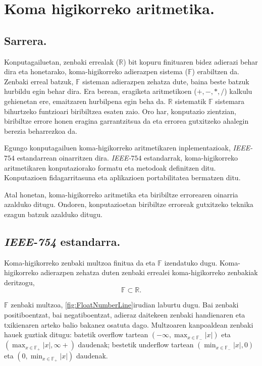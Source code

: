 \chapter{Koma higikorreko aritmetika.}
\label{sec:4}

\section{Sarrera.}

Konputagailuetan, zenbaki errealak ($\mathbb{R}$) bit kopuru finituaren bidez adierazi behar dira eta honetarako, koma-higikorreko adierazpen sistema ($\mathbb{F}$) erabiltzen da. Zenbaki erreal batzuk, $\mathbb{F}$ sisteman adierazpen zehatza dute, baina beste batzuk hurbildu egin behar dira.  Era berean, eragiketa aritmetikoen ($+,-,*,/$) kalkulu gehienetan ere, emaitzaren hurbilpena egin beha da. $\mathbb{R}$ sistematik $\mathbb{F}$ sistemara bihurtzeko funtzioari biribiltzea esaten zaio. Oro har, konputazio zientzian, biribiltze errore honen eragina garrantzitsua da eta errorea gutxitzeko ahalegin berezia beharrezkoa da.

Egungo konputagailuen koma-higikorreko aritmetikaren inplementazioak, \emph{IEEE-$754$} estandarrean \cite{IEEE2008} oinarritzen dira. 
\emph{IEEE-$754$} estandarrak, koma-higikorreko aritmetikaren konputaziorako formatu eta metodoak definitzen ditu. Konputazioen fidagarritasuna eta aplikazioen portabilitatea bermatzen ditu.    
 
Atal honetan, koma-higikorreko aritmetika eta biribiltze errorearen oinarria azalduko ditugu. Ondoren, konputazioetan biribiltze erroreak gutxitzeko teknika ezagun batzuk azalduko ditugu. 

\section{\emph{IEEE-754} estandarra.}

Koma-higikorreko zenbaki multzoa finitua da eta ${\mathbb{F}}$ izendatuko dugu. Koma-higikorreko adierazpen zehatza duten zenbaki errealei koma-higikorreko zenbakiak deritzogu, 
\begin{equation*}
\mathbb{F}\subset \mathbb{R}.
\end{equation*}

$\mathbb{F}$ zenbaki multzoa, \ref{fig:FloatNumberLine}irudian laburtu dugu. Bai zenbaki positiboentzat, bai negatiboentzat, adieraz daitekeen zenbaki handienaren eta txikienaren arteko balio bakanez osatuta dago. Multzoaren kanpoaldean zenbaki hauek guztiak ditugu: batetik overflow tartean $(-\infty,\max_{x \in \mathbb{F_{-}}}|x|)$  eta $(\max_{x \in \mathbb{F_{+}}}|x|,\infty+)$ daudenak; bestetik underflow tartean  $(\min_{x \in \mathbb{F_{-}}}|x|,0)$ eta $(0,\min_{x \in \mathbb{F_{+}}}|x|)$ daudenak. 


